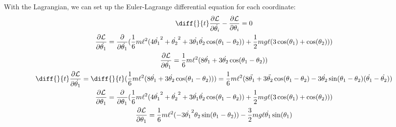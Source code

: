 \documentclass[]{article}
\begin{document}
With the Lagrangian, we can set up the Euler-Lagrange differential equation for each coordinate:
\begin{gather*}
	\diff{}{t}\frac{\partial \lagr}{\partial \dot{\theta_i}} - \frac{\partial \lagr}{\partial \theta_i} = 0 \\
	\frac{\partial \lagr}{\partial \dot{\theta_1}} = \frac{\partial}{\partial \dot{\theta_1}}(\frac16m\ell^2(4\dot{\theta_1}^2 + \dot{\theta_2}^2 + 3\dot{\theta_1}\dot{\theta_2}\cos(\theta_1 - \theta_2)) + \frac12 mg\ell(3\cos(\theta_1) + \cos(\theta_2))) \\
	\frac{\partial \lagr}{\partial \dot{\theta_1}} = \frac16m\ell^2(8\dot{\theta_1} + 3\dot{\theta_2}\cos(\theta_1 - \theta_2)) \\
	\diff{}{t}\frac{\partial \lagr}{\partial \dot{\theta_1}} = \diff{}{t}(\frac16m\ell^2(8\dot{\theta_1} + 3\dot{\theta_2}\cos(\theta_1 - \theta_2))) = \frac16m\ell^2(8\ddot{\theta_1} + 3\ddot{\theta_2}\cos(\theta_1 - \theta_2) - 3\dot{\theta_2}\sin(\theta_1 - \theta_2)(\dot{\theta_1} - \dot{\theta_2})) \\
	\frac{\partial \lagr}{\partial \theta_1} = \frac{\partial}{\partial \theta_1} (\frac16m\ell^2(4\dot{\theta_1}^2 + \dot{\theta_2}^2 + 3\dot{\theta_1}\dot{\theta_2}\cos(\theta_1 - \theta_2)) + \frac12 mg\ell(3\cos(\theta_1) + \cos(\theta_2))) \\
	\frac{\partial \lagr}{\partial \theta_1} = \frac16m\ell^2(-3\dot{\theta_1}^2\theta_2\sin(\theta_1 - \theta_2)) - \frac32m g \ell \dot{\theta_1} \sin(\theta_1)
\end{gather*}
\end{document}
